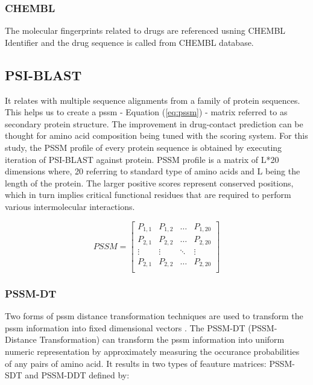 \subsubsection{CHEMBL}
The molecular fingerprints related to drugs are referenced usning CHEMBL Identifier and the drug sequence is called from CHEMBL database. \cite{Gaulton2017}

\subsection{PSI-BLAST}
It relates with multiple sequence alignments from a family of protein sequences\cite{Schaffer2001}. This helps us to create a \acrshort{pssm} - Equation (\ref{eq:pssm}) - matrix referred to as secondary protein structure. The improvement in drug-contact prediction can be thought for amino acid composition being tuned with the scoring system. For this study, the PSSM profile of every protein sequence is obtained by executing iteration of PSI-BLAST against \cite[KEGG]{Schaffer2001} protein. PSSM profile is a matrix of L*20 dimensions where, 20 referring to standard type of amino acids and L being the length of the protein. The larger positive scores represent conserved positions, which in turn implies critical functional residues that are required to perform various intermolecular interactions.\cite[PSSM]{Schaffer2001}

\begin{equation}
  PSSM = \begin{bmatrix}
    P_{1,1} & P_{1,2} & \dots & P_{1,20} \\
    P_{2,1} & P_{2,2} & \dots & P_{2,20} \\
    \vdots  & \vdots  & \ddots & \vdots \\
    P_{2,1} & P_{2,2} & \dots & P_{2,20} \\
  \end{bmatrix}
  \label{eq:pssm}
\end{equation}

\subsubsection{PSSM-DT}
Two forms of \acrshort{pssm} distance transformation techniques are used to transform the \acrshort{pssm} information into fixed dimensional vectors \cite{Xu2015}. The PSSM-DT (PSSM-Distance Transformation) can transform the \acrshort{pssm} information into uniform numeric representation by approximately measuring the occurance probabilities of any pairs of amino acid. It results in two types of feauture matrices: PSSM-SDT and PSSM-DDT defined by:

